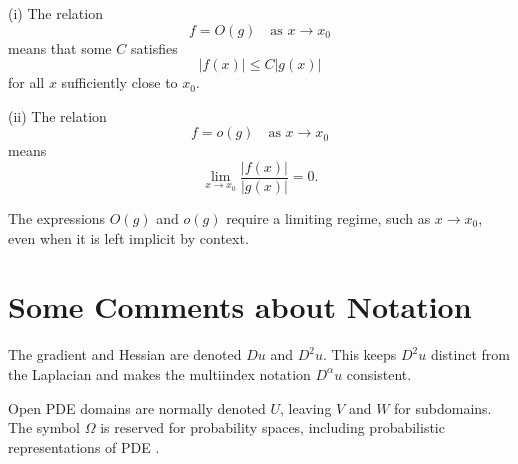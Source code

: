 \begin{definition}
\label{def:big-oh-little-oh-notation}
(i) The relation
\[
f=O(g)\quad\text{as }x\to x_0
\]
means that some $C$ satisfies
\[
|f(x)|\leq C|g(x)|
\]
for all $x$ sufficiently close to $x_0$.

(ii) The relation
\[
f=o(g)\quad\text{as }x\to x_0
\]
means
\[
\lim_{x\to x_0}\frac{|f(x)|}{|g(x)|}=0.
\]
\end{definition}

\begin{remark}
\label{rem:big-oh-little-oh-implicit-limit}

The expressions $O(g)$ and $o(g)$ require a limiting regime, such as $x\to x_0$, even when it is left implicit by context.
\end{remark}

\section{Some Comments about Notation}
\label{sec:comments-about-notation}

\begin{remark}
\label{rem:gradient-notation-choice-du}

The gradient and Hessian are denoted $Du$ and $D^2u$. This keeps $D^2u$ distinct from the Laplacian and makes the multiindex notation $D^\alpha u$ consistent.
\end{remark}

\begin{remark}
\label{rem:domain-notation-choice-u}

Open PDE domains are normally denoted $U$, leaving $V$ and $W$ for subdomains. The symbol $\Omega$ is reserved for probability spaces, including probabilistic representations of PDE \cite{Freidlin1985}.
\end{remark}

